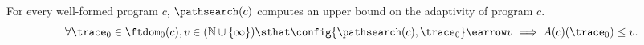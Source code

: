 \begin{theorem}
  For every well-formed program $c$, $\pathsearch(c)$ computes an upper bound on 
  the adaptivity of program $c$.
  \[ 
    \forall \trace_0 \in \ftdom_{0}(c), v \in (\mathbb{N}\cup \{\infty\}) \sthat
  \config{\pathsearch(c), \trace_0} \earrow v \implies A(c)(\trace_0) \leq v.
  \]
\end{theorem}
